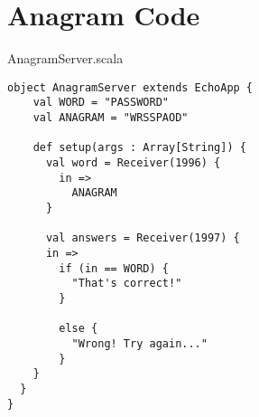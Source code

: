 \chapter{Anagram Code}

AnagramServer.scala

\begin{verbatim}
object AnagramServer extends EchoApp {
	val WORD = "PASSWORD"
	val ANAGRAM = "WRSSPAOD"
	
	def setup(args : Array[String]) {	
	  val word = Receiver(1996) {
	    in =>
	      ANAGRAM
	  }
	  
	  val answers = Receiver(1997) {
      in =>
        if (in == WORD) {
          "That's correct!"
        }

        else {
          "Wrong! Try again..."
        }
    }
  }
}
\end{verbatim}